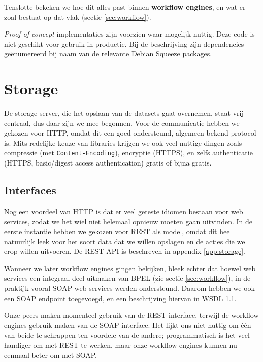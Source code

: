 \documentclass[a4paper]{article}
\begin{document}
Tenslotte bekeken we hoe dit alles past binnen {\bf workflow engines}, en wat
er zoal bestaat op dat vlak (sectie \ref{sec:workflow}).

{\it Proof of concept} implementaties zijn voorzien waar mogelijk nuttig. Deze
code is niet geschikt voor gebruik in productie. Bij de beschrijving zijn
dependencies ge\"enumereerd bij naam van de relevante Debian Squeeze packages.

\newpage

\section{Storage}
\label{sec:storage}

De storage server, die het opslaan van de datasets gaat overnemen, staat vrij
centraal, dus daar zijn we mee begonnen. Voor de communicatie hebben we gekozen
voor \gls{HTTP}, omdat dit een goed ondersteund, algemeen bekend protocol is.
Mits redelijke keuze van libraries krijgen we ook veel nuttige dingen zoals
compressie (met {\tt Content-Encoding}), encryptie (\gls{HTTPS}), en zelfs
authenticatie (\gls{HTTPS}, basic/digest access authentication) gratis of bijna
gratis.

\subsection{Interfaces}

Nog een voordeel van \gls{HTTP} is dat er veel geteste idiomen bestaan voor web
services, zodat we het wiel niet helemaal opnieuw moeten gaan uitvinden. In de
eerste instantie hebben we gekozen voor \gls{REST} als model, omdat dit heel
natuurlijk leek voor het soort data dat we willen opslagen en de acties die we
erop willen uitvoeren. De \gls{REST} \gls{API} is beschreven in appendix
\ref{app:storage}.

Wanneer we later workflow engines gingen bekijken, bleek echter dat hoewel web
services een integraal deel uitmaken van \gls{BPEL} (zie sectie
\ref{sec:workflow}), in de praktijk vooral \gls{SOAP} web services werden
ondersteund. Daarom hebben we ook een \gls{SOAP} endpoint toegevoegd, en een
beschrijving hiervan in \gls{WSDL} 1.1.

Onze peers maken momenteel gebruik van de \gls{REST} interface, terwijl de
workflow engines gebruik maken van de \gls{SOAP} interface. Het lijkt ons niet
nuttig om \'e\'en van beide te schrappen ten voordele van de andere;
programmatisch is het veel handiger om met \gls{REST} te werken, maar onze
workflow engines kunnen nu eenmaal beter om met \gls{SOAP}.
\end{document}
